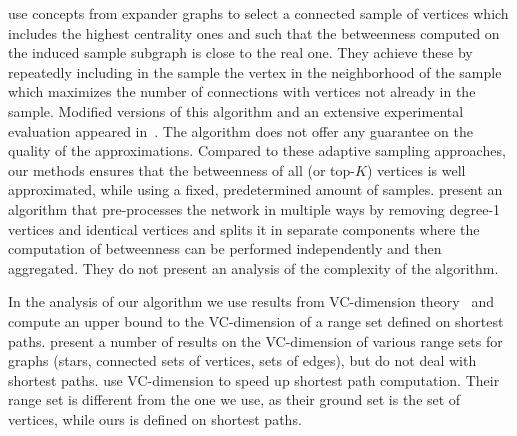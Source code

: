 \citet{MaiyaBW10} use concepts from expander
graphs to select a connected sample of vertices which includes the highest
centrality ones and such that the betweenness computed on the induced sample
subgraph is close to the real one.  They achieve these by repeatedly including
in the sample the vertex in the neighborhood of the sample which maximizes the
number of connections with vertices not already in the sample. Modified versions
of this algorithm and an extensive experimental evaluation appeared
in~\citep{LimMRTB11}. The algorithm does not offer any guarantee on the quality
of the approximations. Compared to these adaptive sampling approaches, our
methods ensures that the betweenness of all (or top-$K$) vertices is well
approximated, while using a fixed, predetermined amount of samples.
\citep{SaryuceSKC13} present an algorithm that pre-processes the network in
multiple ways by removing degree-1 vertices and identical vertices and splits it
in separate components where the computation of betweenness can be performed
independently and then aggregated. They do not present an analysis of the
complexity of the algorithm. 

In the analysis of our algorithm we use results from VC-dimension
theory~\citep{VapnikC71} and compute an upper bound to the VC-dimension of a
range set defined on shortest paths. \citet{KranakisKRUW97} present a number of
results on the VC-dimension of various range sets for graphs (stars, connected
sets of vertices, sets of edges), but do not deal with shortest paths.
\citet{AbrahamDFGW11} use VC-dimension to speed up shortest path computation.
Their range set is different from the one we use, as their ground set is the
set of vertices, while ours is defined on shortest paths.

